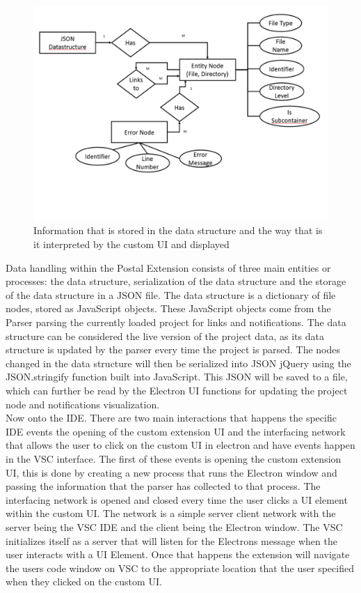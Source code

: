 \documentclass[letterpaper,10pt,titlepage,draftclsnofoot,onecolumn,onesided] {IEEEtran}
\begin{document}
\begin{figure}[H]
	\centering
	\includegraphics[width=.75\textwidth]{UpdatedDataStruct-eps-converted-to}
	\caption{Information that is stored in the data structure and the way that is it interpreted by the custom UI and displayed}
\end{figure}

Data handling within the Postal Extension consists of three main entities or processes: the data structure, serialization of the data structure and the storage of the data structure in a JSON file.
The data structure is a dictionary of file nodes, stored as JavaScript objects. 
These JavaScript objects come from the Parser parsing the currently loaded project for links and notifications.
The data structure can be considered the live version of the project data, as its data structure is updated by the parser every time the project is parsed. 
The nodes changed in the data structure will then be serialized into JSON jQuery using the JSON.stringify function built into JavaScript. 
This JSON will be saved to a file, which can further be read by the Electron UI functions for updating the project node and notifications visualization. \\

Now onto the IDE. 
There are two main interactions that happens the specific IDE events the opening of the custom extension UI and the interfacing network that allows the user to click on the custom UI in electron and have events happen in the VSC interface. 
The first of these events is opening the custom extension UI, this is done by creating a new process that runs the Electron window and passing the information that the parser has collected to that process.  
The interfacing network is opened and closed every time the user clicks a UI element within the custom UI. 
The network is a simple server client network with the server being the VSC IDE and the client being the Electron window. 
The VSC initializes itself as a server that will listen for the Electrons message when the user interacts with a UI Element. 
Once that happens the extension will navigate the users code window on VSC to the appropriate location that the user specified when they clicked on the custom UI.  \\
\end{document}
